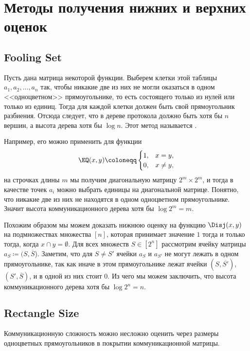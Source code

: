 \section{Методы получения нижних и верхних оценок}

\subsection{Fooling Set}

Пусть дана матрица некоторой функции. Выберем клетки этой таблицы $a_1, a_2, \ldots, a_n$ так, чтобы
никакие две из них не могли оказаться в одном <<одноцветном>> прямоугольнике, то есть состоящего только
из нулей или только из единиц. Тогда для каждой клетки должен быть свой прямоугольник разбиения. Отсюда
следует, что в дереве протокола должно быть хотя бы $n$ вершин, а высота дерева хотя бы $\log n$. Этот
метод называется .  

Например, его можно применить для функции
$$
    \EQ(x, y) \coloneqq
    \begin{cases}
        1, & x = y,\\
        0, & x \neq y,
    \end{cases}
$$
на строчках длины $m$ мы получим диагональную матрицу $2^m \times 2^m$, и тогда в качестве точек $a_i$
можно выбрать единицы на диагональной матрице. Понятно, что никакие две из них не находятся в одном
одноцветном прямоугольнике. Значит высота коммуникационного дерева хотя бы $\log 2^m = m$.

Похожим образом мы можем доказать нижнюю оценку на функцию $\Disj(x, y)$ на подмножествах множества
$[n]$, которая принимает значение $1$ тогда и только тогда, когда $ x \cap y = \emptyset$. Для всех
множеств $S \in [2^n]$ рассмотрим ячейку матрицы $a_S \coloneqq (S, \overline{S}$). Заметим, что для $S
\neq S'$ ячейки $a_S$ и $a_{S'}$ не могут лежать в одном прямоугольнике, так как иначе в этом
прямоугольнике лежат ячейки $(S, \overline{S'})$, $(S', \overline{S})$, и в одной из них стоит $0$. Из
чего мы можем заключить, что высота коммуникационного дерева хотя бы $\log 2^n = n$.  


\subsection{Rectangle Size}

Коммуникационную сложность можно несложно оценить через размеры одноцветных прямоугольников в покрытии
коммуникационной матрицы.


